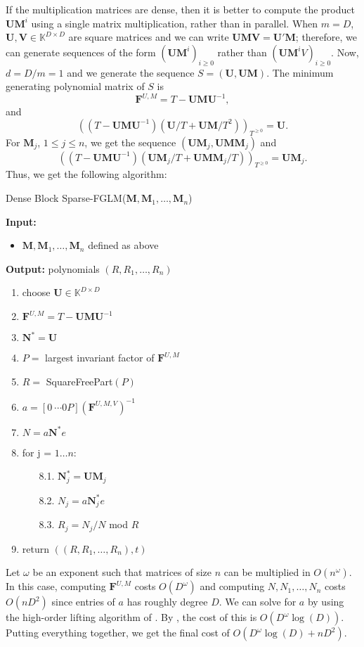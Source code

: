 \documentclass[12pt]{article}
\def\mF{\mathbf{F}}
\def\mM{\mathbf{M}}
\def\mN{\mathbf{N}}
\def\mU{\mathbf{U}}
\def\mV{\mathbf{V}}
\begin{document}
If the multiplication matrices are dense, then it is
better to compute the product $\mU \mM^i$ using a single matrix multiplication,
rather than in parallel.
When $m = D$, $\mU,\mV \in \mathbb{K}^{D \times D}$ are square matrices
and we can write $\mU\mM\mV = \mU'\mM$; therefore, we can generate sequences of the
form $(\mU\mM^i)_{i\ge0}$ rather than $(\mU\mM^iV)_{i\ge0}$. Now, $d = D/m = 1$
and we generate the sequence $ S = (\mU, \mU\mM)$. The minimum generating polynomial
matrix of $S$ is 
$$\mF^{U,M} = T - \mU\mM\mU^{-1},$$ 
and 
$$((T - \mU\mM\mU^{-1})(\mU/T + \mU\mM/T^2))_{T^{\ge 0}} = \mU. $$
For $\mM_j$, $1 \le j \le n$, we get the sequence $(\mU\mM_j,\mU\mM\mM_j)$ and
$$((T - \mU\mM\mU^{-1})(\mU\mM_j/T + \mU\mM\mM_j/T))_{T^{\ge 0}} = \mU\mM_j.$$
Thus, we get the following algorithm:

\begin{algorithm}[H]
	\caption{Dense Block Sparse-FGLM($\mM,\mM_1,\dots,\mM_n$)}
	{\bf Input:} \vspace{-0.5em}
	\begin{itemize}
		\item $\mM,\mM_1,\dots,\mM_n$ defined as above
	\end{itemize}
	{\bf Output:} polynomials $(R,R_1,\dots,R_n)$
	\begin{enumerate}\setlength\itemsep{0em}
		\item choose $\mU \in \mathbb{K}^{D\times D}$
		\item $\mF^{U,M} = T - \mU\mM\mU^{-1}$
		\item $\mN^{*} = \mU$
		\item $P =$ largest invariant factor of $\mF^{U,M}$
		\item $R =$ SquareFreePart$(P)$
		\item {\sf $a = [0 ~\cdots 0 P] (\mF^{U,M,V})^{-1}$}
		\item {\sf $N=a\mN^*e$}
		\item {for j = $1 \dots n$:}
		\begin{itemize}
			\item[8.1. ] $\mN_j^* = \mU\mM_j$
			\item[8.2. ] $N_j = a\mN_j^*e$
			\item[8.3. ] $R_j = N_j/N$ mod $R$
		\end{itemize}
		\item return $((R, R_1,\dots,R_n),t)$
	\end{enumerate}
	\label{algo:dense-block-sparse-fglm}
\end{algorithm}
Let $\omega$ be an exponent such that matrices of size $n$ can be multiplied
in $O(n^{\omega})$. In this case, computing $\mF^{U,M}$ costs $O(D^\omega)$
and computing $N,N_1,\dots,N_n$ costs $O(nD^2)$ since entries of $a$ has roughly degree $D$. We can solve for $a$ by
using the high-order lifting algorithm of \cite[Algorithm~5]{Stor03}. 
By \cite[Corollary~16]{Stor03}, the cost of this is $O(D^\omega \log(D))$.
Putting everything together, we get the final cost of $O(D^\omega\log(D) + nD^2)$.
\end{document}
